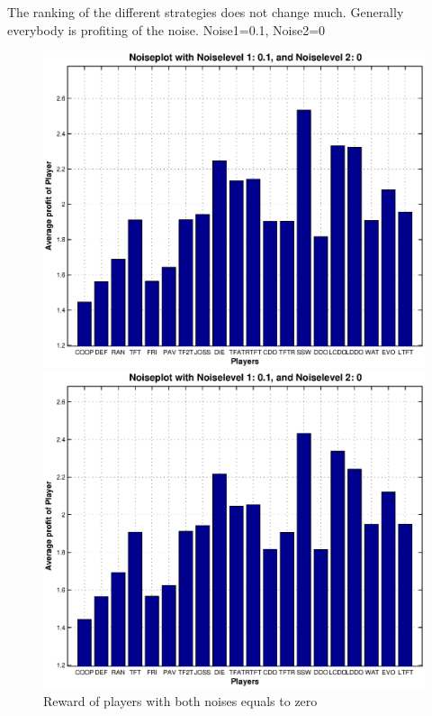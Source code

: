 The ranking of the different strategies does not change much. Generally everybody is profiting of the noise.
Noise1=0.1, Noise2=0

\begin{figure}[h]

\begin{minipage}[hbt]{0.68\textwidth}
	\centering
	\includegraphics[width=\textwidth]{pics/simulation1/Reward_of_all_Players_at_given_Noiselevels_3}
\end{minipage}
\hfill
\begin{minipage}[hbt]{0.3\textwidth}
	\centering
	\includegraphics[width=\textwidth]{pics/simulation2/Reward_of_all_Players_at_given_Noiselevels_3}
\end{minipage}	\caption{Reward of players with both noises equals to zero}
	\label{pic player noise1}
\end{figure}

